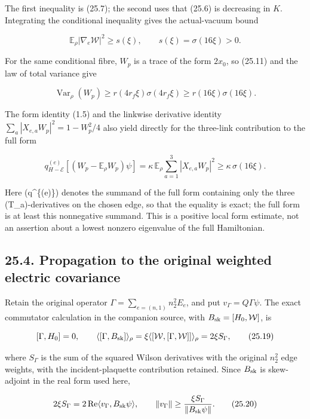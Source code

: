 \documentclass[
]{article}
\begin{document}
The first inequality is (25.7); the second uses that (25.6) is
decreasing in \(K\). Integrating the conditional inequality gives the
actual-vacuum bound

\[
 \mathbb E_\rho|\nabla_e\mathcal W|^2\ge s(\xi),
 \qquad s(\xi)=\sigma(16\xi)>0.
 \tag{25.16}
\]

For the same conditional fibre, \(W_p\) is a trace of the form \(2x_0\),
so (25.11) and the law of total variance give

\[
 \operatorname{Var}_\rho(W_p)
 \ge r(4r_f\xi)\sigma(4r_f\xi)
 \ge r(16\xi)\sigma(16\xi).
 \tag{25.17}
\]

The form identity (1.5) and the linkwise derivative identity
\(\sum_a|X_{e,a}W_p|^2=1-W_p^2/4\) also yield directly for the
three-link contribution to the full form

\[
 q^{(e)}_{H-\mathcal E}[(W_p-\mathbb E_\rho W_p)\psi]
 =\kappa\,\mathbb E_\rho\sum_{a=1}^3|X_{e,a}W_p|^2
 \ge\kappa\,\sigma(16\xi).
 \tag{25.18}
\]

Here (q\^{}\{(e)\}) denotes the summand of the full form containing only
the three (T\_a)-derivatives on the chosen edge, so that the equality is
exact; the full form is at least this nonnegative summand. This is a
positive local form estimate, not an assertion about a lowest nonzero
eigenvalue of the full Hamiltonian.

\subsection{25.4. Propagation to the original weighted electric
covariance}\label{propagation-to-the-original-weighted-electric-covariance}

Retain the original operator \(\Gamma=\sum_{e=(n,1)}n_2^2E_e\), and put
\(v_\Gamma=Q\Gamma\psi\). The exact commutator calculation in the
companion source, with \(B_{\rm sk}=[H_0,\mathcal W]\), is

\[
 [\Gamma,H_0]=0,
 \qquad
 \langle[\Gamma,B_{\rm sk}]\rangle_\rho
 =\xi\langle[\mathcal W,[\Gamma,\mathcal W]]\rangle_\rho
 =2\xi S_\Gamma,
 \tag{25.19}
\]

where \(S_\Gamma\) is the sum of the squared Wilson derivatives with the
original \(n_2^2\) edge weights, with the incident-plaquette
contribution retained. Since \(B_{\rm sk}\) is skew-adjoint in the real
form used here,

\[
 2\xi S_\Gamma
 =2\operatorname{Re}\langle v_\Gamma,B_{\rm sk}\psi\rangle,
 \qquad
 \|v_\Gamma\|\ge\frac{\xi S_\Gamma}{\|B_{\rm sk}\psi\|}.
 \tag{25.20}
\]
\end{document}
